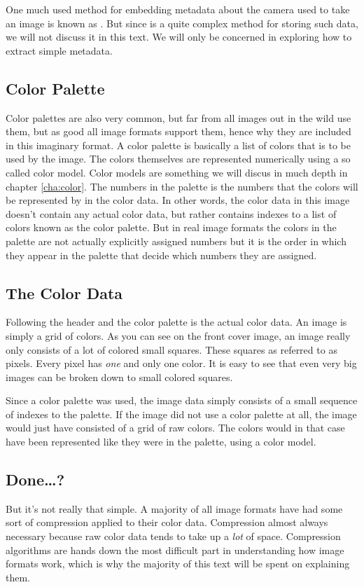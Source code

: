 One much used method for embedding metadata about the camera used to
take an image is known as
\exif\cite{camera:_cipa_dc_trans_exchan}. But since \exif is a quite
complex method for storing such data, we will not discuss it in this
text. We will only be concerned in exploring how to extract simple
metadata.

\subsection{Color Palette}

Color palettes are also very common, but far from all images out in
the wild use them, but as good all image formats support them, hence
why they are included in this imaginary format. A color palette is
basically a list of colors that is to be used by the image. The colors
themselves are represented numerically using a so called color
model. Color models are something we will discus in much depth in
chapter \ref{cha:color}. The numbers in the palette is the numbers
that the colors will be represented by in the color data. In other
words, the color data in this image doesn't contain any actual color
data, but rather contains indexes to a list of colors known as the
color palette. But in real image formats the colors in the palette are
not actually explicitly assigned numbers but it is the order in which
they appear in the palette that decide which numbers they are
assigned.

\subsection{The Color Data}

Following the header and the color palette is the actual color data.
An image is simply a grid of colors. As you can see on the front cover
image, an image really only consists of a lot of colored small
squares. These squares as referred to as
pixels\cite{murray1996encyclopedia}. Every pixel has \textit{one} and
only one color. It is easy to see that even very big images can be
broken down to small colored squares.

Since a color palette was used, the image data simply consists of a
small sequence of indexes to the palette. If the image did not use a
color palette at all, the image would just have consisted of a grid of
raw colors. The colors would in that case have been represented like
they were in the palette, using a color model.

\subsection{Done\dots?}

But it's not really that simple. A majority of all image formats have
had some sort of compression applied to their color data. Compression
almost always necessary because raw color data tends to take up a
\textit{lot} of space. Compression algorithms are hands down the most
difficult part in understanding how image formats work, which is why
the majority of this text will be spent on explaining them.

